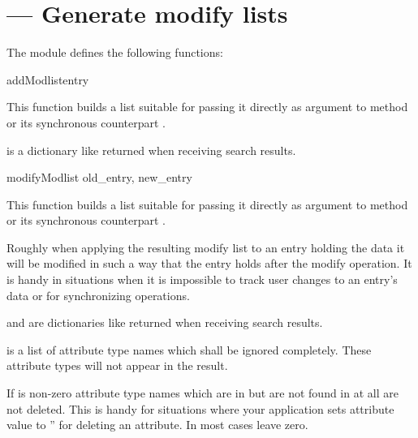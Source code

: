 
\section{ ---
  Generate modify lists }




The  module defines the following functions:

\begin{funcdesc}{addModlist}{entry } %

This function builds a list suitable for passing it
directly as argument  to method  or
its synchronous counterpart .

 is a dictionary like returned when
receiving search results.

\end{funcdesc}

\begin{funcdesc}{modifyModlist}{ old_entry, new_entry } %

This function builds a list suitable for passing it directly as argument
 to method  or its synchronous counterpart
.

Roughly when applying the resulting modify list to an entry holding
the data  it will be modified in such a way that the
entry holds  after the modify operation. It is handy in
situations when it is impossible to track user changes to an entry's
data or for synchronizing operations.

 and  are dictionaries
like returned when receiving search results.

 is a list of attribute type names which
shall be ignored completely. These attribute types will not appear
in the result.

If  is non-zero attribute type names which
are in  but are not found in  at all
are not deleted. This is handy for situations where your application
sets attribute value to '' for deleting an attribute.
In most cases leave zero.

\end{funcdesc}

